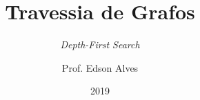\title{Travessia de Grafos}
\subtitle{\textit{Depth-First Search}}
\date{2019}
\author{Prof. Edson Alves}
